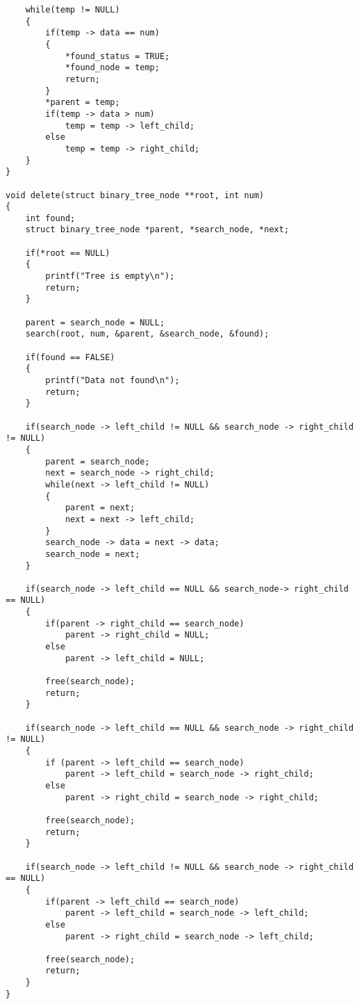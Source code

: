 \documentclass[10pt, a4paper, twosize]{article}
\begin{document}
\begin{lstlisting}
    while(temp != NULL)
    {
        if(temp -> data == num)
        {
            *found_status = TRUE;
            *found_node = temp;
            return;
        }
        *parent = temp;
        if(temp -> data > num)
            temp = temp -> left_child;
        else
            temp = temp -> right_child;
    }
}

void delete(struct binary_tree_node **root, int num)
{
    int found;
    struct binary_tree_node *parent, *search_node, *next;

    if(*root == NULL)
    {
        printf("Tree is empty\n");
        return;
    }

    parent = search_node = NULL;
    search(root, num, &parent, &search_node, &found);

    if(found == FALSE)
    {
        printf("Data not found\n");
        return;
    }

    if(search_node -> left_child != NULL && search_node -> right_child != NULL)
    {
        parent = search_node;
        next = search_node -> right_child;
        while(next -> left_child != NULL)
        {
            parent = next;
            next = next -> left_child;
        }
        search_node -> data = next -> data;
        search_node = next;
    }

    if(search_node -> left_child == NULL && search_node-> right_child == NULL)
    {
        if(parent -> right_child == search_node)
            parent -> right_child = NULL;
        else
            parent -> left_child = NULL;

        free(search_node);
        return;
    }

    if(search_node -> left_child == NULL && search_node -> right_child != NULL)
    {
        if (parent -> left_child == search_node)
            parent -> left_child = search_node -> right_child;
        else
            parent -> right_child = search_node -> right_child;

        free(search_node);
        return;
    }

    if(search_node -> left_child != NULL && search_node -> right_child == NULL)
    {
        if(parent -> left_child == search_node)
            parent -> left_child = search_node -> left_child;
        else
            parent -> right_child = search_node -> left_child;

        free(search_node);
        return;
    }
}
\end{lstlisting}
\paragraph{} 
\end{document}

